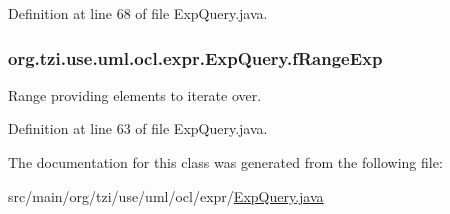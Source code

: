 Definition at line 68 of file Exp\-Query.\-java.

\hypertarget{classorg_1_1tzi_1_1use_1_1uml_1_1ocl_1_1expr_1_1_exp_query_a2444567d3e10350a6c4936e1685b20fb}{
\subsubsection[{f\-Range\-Exp}]{ org.\-tzi.\-use.\-uml.\-ocl.\-expr.\-Exp\-Query.\-f\-Range\-Exp\hspace{0.3cm}{\ttfamily [protected]}}}\label{classorg_1_1tzi_1_1use_1_1uml_1_1ocl_1_1expr_1_1_exp_query_a2444567d3e10350a6c4936e1685b20fb}
Range providing elements to iterate over. 

Definition at line 63 of file Exp\-Query.\-java.



The documentation for this class was generated from the following file\-:\begin{DoxyCompactItemize}
\item 
src/main/org/tzi/use/uml/ocl/expr/\hyperlink{_exp_query_8java}{Exp\-Query.\-java}\end{DoxyCompactItemize}
